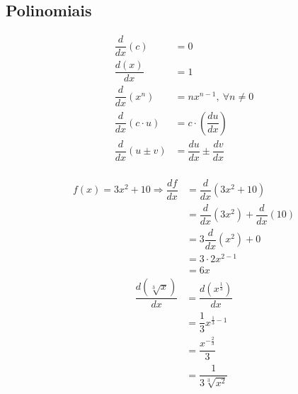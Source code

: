 \subsection{Polinomiais}
\begin{align*}
\dfrac{d}{dx}(c)&=0 \\ \dfrac{d(x)}{dx}&=1 \\ \dfrac{d}{dx}(x^n)&=nx^{n-1}, \: \forall n \neq 0 \\ \dfrac{d}{dx}\left(c\cdot u\right)&=c\cdot \left(\dfrac{du}{dx}\right) \\ \dfrac{d}{dx}(u\pm v)&=\dfrac{du}{dx}\pm \dfrac{dv}{dx} \\ 
\end{align*}
\begin{exemplo}
\begin{align*}
f(x)=3x^2+10 \Rightarrow \dfrac{df}{dx}&=\dfrac{d}{dx}(3x^2+10)\\ &=\dfrac{d}{dx}(3x^2)+\dfrac{d}{dx}(10) \\ &=3\dfrac{d}{dx}(x^2)+0 \\ &=3\cdot 2x^{2-1}\\ &=6x
\end{align*}
\begin{align*}
\dfrac{d(\sqrt[3]{x})}{dx}&=\dfrac{d(x^{\frac{1}{3}})}{dx}\\
&=\dfrac{1}{3}x^{\frac{1}{3}-1}\\
&=\dfrac{x^{-\frac{2}{3}}}{3}\\
&=\dfrac{1}{3\sqrt[3]{x^2}}
\end{align*}
\end{exemplo}

